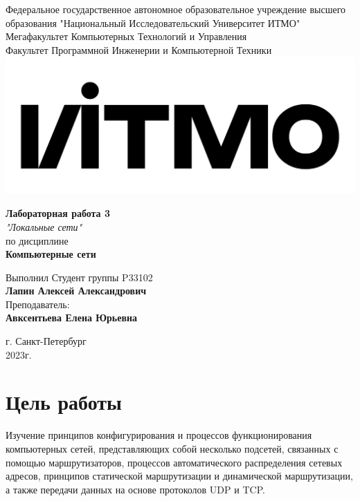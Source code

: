 \documentclass[12pt,onecolumn]{article}
\begin{document}
\setcounter{tocdepth}{4}
\begin{center}
    Федеральное государственное автономное образовательное учреждение высшего образования "Национальный Исследовательский Университет ИТМО"\\ 
    Мегафакультет Компьютерных Технологий и Управления\\
    Факультет Программной Инженерии и Компьютерной Техники \\
    \includegraphics[scale=0.3]{image/itmo.jpg} %
\end{center}
\vspace{1cm}


\begin{center}
    \textbf{Лабораторная работа 3}\\
    \textit{"Локальные сети"}\\
    по дисциплине\\
    \textbf{Компьютерные сети}
\end{center}

\vspace{2cm}

\begin{flushright}
  Выполнил Студент  группы P33102\\
  \textbf{Лапин Алексей Александрович}\\
  Преподаватель: \\
  \textbf{Авксентьева Елена Юрьевна}\\
\end{flushright}

\vspace{6cm}
\begin{center}
    г. Санкт-Петербург\\
    2023г.
\end{center}

\newpage
\tableofcontents
\newpage

\section*{Цель работы}
Изучение принципов конфигурирования и процессов функционирования компьютерных сетей, представляющих собой несколько подсетей, связанных с помощью маршрутизаторов, процессов автоматического распределения сетевых адресов, принципов статической маршрутизации и динамической маршрутизации, а также передачи данных на основе протоколов UDP и TCP.
\end{document}

